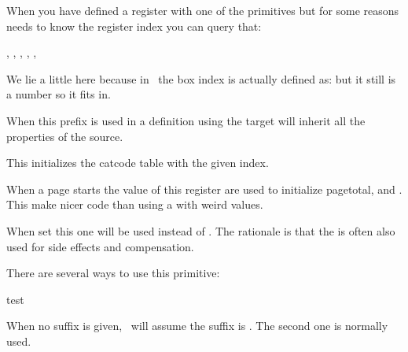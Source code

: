When you have defined a register with one of the  primitives but for
some reasons needs to know the register index you can query that:

\startbuffer
\the\indexofregister \scratchcounterone,
\the\indexofregister \scratchcountertwo,
\the\indexofregister \scratchwidth,
\the\indexofregister \scratchheight,
\the\indexofregister \scratchdepth,
\the\indexofregister \scratchbox
\stopbuffer

\typebuffer

We lie a little here because in \CONTEXT\ the box index  is
actually defined as: \normalexpanded {\typ {\meaningasis \scratchbox}} but it
still is a number so it fits in.

\getbuffer

\stopnewprimitive

\startnewprimitive[title={\prm {inherited}}]

When this prefix is used in a definition using  the target will inherit
all the properties of the source.

\stopnewprimitive

\startnewprimitive[title={\prm {initcatcodetable}}]

This initializes the catcode table with the given index.

\stopnewprimitive

\startnewprimitive[title={\prm {initialpageskip}}]

When a page starts the value of this register are used to initialize \prm
{pagetotal},  and . This make nicer code than
using a  with weird values.

\stopnewprimitive

\startnewprimitive[title={\prm {initialtopskip}}]

When set this one will be used instead of . The rationale is that
the  is often also used for side effects and compensation.

\stopnewprimitive

\startoldprimitive[title={\prm {input}}]

There are several ways to use this primitive:

\starttyping

 {test}


\stoptyping

When no suffix is given, \TEX\ will assume the suffix is . The second
one is normally used.

\stopoldprimitive

